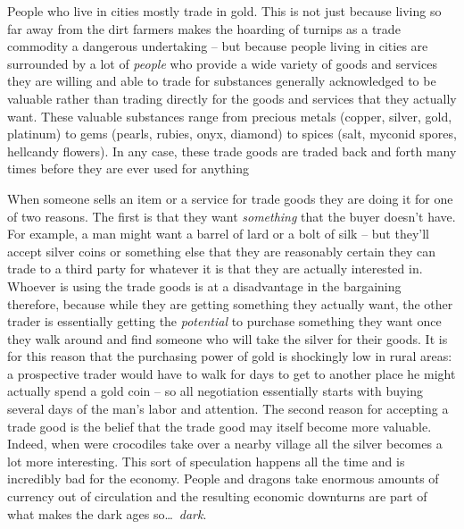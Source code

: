 People who live in cities mostly trade in gold. This is not just because living so far away from the dirt farmers makes the hoarding of turnips as a trade commodity a dangerous undertaking -- but because people living in cities are surrounded by a lot of \textit{people} who provide a wide variety of goods and services they are willing and able to trade for substances generally acknowledged to be valuable rather than trading directly for the goods and services that they actually want. These valuable substances range from precious metals (copper, silver, gold, platinum) to gems (pearls, rubies, onyx, diamond) to spices (salt, myconid spores, hellcandy flowers). In any case, these trade goods are traded back and forth many times before they are ever used for anything

When someone sells an item or a service for trade goods they are doing it for one of two reasons. The first is that they want \textit{something} that the buyer doesn't have. For example, a man might want a barrel of lard or a bolt of silk -- but they'll accept silver coins or something else that they are reasonably certain they can trade to a third party for whatever it is that they are actually interested in. Whoever is using the trade goods is at a disadvantage in the bargaining therefore, because while they are getting something they actually want, the other trader is essentially getting the \textit{potential} to purchase something they want once they walk around and find someone who will take the silver for their goods. It is for this reason that the purchasing power of gold is shockingly low in rural areas: a prospective trader would have to walk for days to get to another place he might actually spend a gold coin -- so all negotiation essentially starts with buying several days of the man's labor and attention. The second reason for accepting a trade good is the belief that the trade good may itself become more valuable. Indeed, when were crocodiles take over a nearby village all the silver becomes a lot more interesting. This sort of speculation happens all the time and is incredibly bad for the economy. People and dragons take enormous amounts of currency out of circulation and the resulting economic downturns are part of what makes the dark ages so\ldots\ \textit{dark}.

